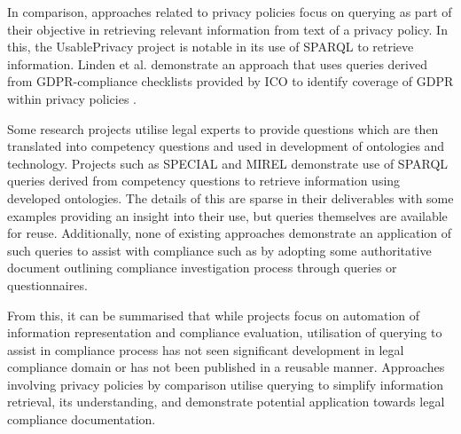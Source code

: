 In comparison, approaches related to privacy policies focus on querying as part of their objective in retrieving relevant information from text of a privacy policy. In this, the UsablePrivacy project is notable in its use of SPARQL to retrieve information. Linden et al. demonstrate an approach that uses queries derived from GDPR-compliance checklists provided by ICO to identify coverage of GDPR within privacy policies \cite{linden_privacy_2018}.

Some research projects utilise legal experts to provide questions which are then translated into competency questions and used in development of ontologies and technology. Projects such as SPECIAL and MIREL demonstrate use of SPARQL queries derived from competency questions to retrieve information using developed ontologies. The details of this are sparse in their deliverables with some examples providing an insight into their use, but queries themselves are available for reuse. Additionally, none of existing approaches demonstrate an application of such queries to assist with compliance such as by adopting some authoritative document outlining compliance investigation process through queries or questionnaires.

From this, it can be summarised that while projects focus on automation of information representation and compliance evaluation, utilisation of querying to assist in compliance process has not seen significant development in  legal compliance domain or has not been published in a reusable manner. Approaches involving privacy policies by comparison utilise querying to simplify information retrieval, its understanding, and demonstrate potential application towards legal compliance documentation.


